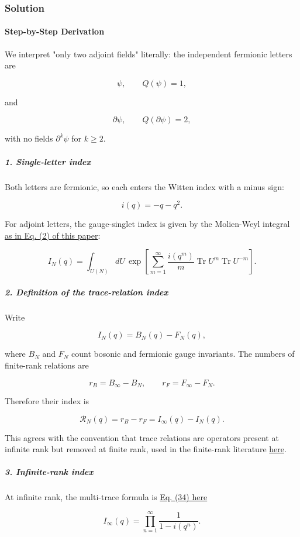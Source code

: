 \subsubsection*{Solution}
\paragraph*{Step-by-Step Derivation}

We interpret "only two adjoint fields" literally: the independent fermionic letters are

\[
\psi,\qquad Q(\psi)=1,
\]

and

\[
\partial\psi,\qquad Q(\partial\psi)=2,
\]

with no fields $\partial^k\psi$ for $k\geq2$.

\subparagraph*{1. Single-letter index}

Both letters are fermionic, so each enters the Witten index with a minus sign:

\[
i(q)=-q-q^2.
\]

For adjoint letters, the gauge-singlet index is given by the Molien-Weyl integral \href{\detokenize{https://arxiv.org/html/2605.08085}}{as in Eq. (2) of this paper}:

\[
I_N(q)=\int_{U(N)}dU\, \exp\left[ \sum_{m=1}^{\infty}\frac{i(q^m)}{m} \operatorname{Tr}U^m\operatorname{Tr}U^{-m} \right].
\]

\subparagraph*{2. Definition of the trace-relation index}

Write

\[
I_N(q)=B_N(q)-F_N(q),
\]

where $B_N$ and $F_N$ count bosonic and fermionic gauge invariants. The numbers of finite-rank relations are

\[
r_B=B_\infty-B_N,\qquad r_F=F_\infty-F_N.
\]

Therefore their index is

\[
\mathcal R_N(q)=r_B-r_F =I_\infty(q)-I_N(q).
\]

This agrees with the convention that trace relations are operators present at infinite rank but removed at finite rank, used in the finite-rank literature \href{\detokenize{https://arxiv.org/html/2605.08085}}{here}.

\subparagraph*{3. Infinite-rank index}

At infinite rank, the multi-trace formula is \href{\detokenize{https://arxiv.org/html/2605.08085}}{Eq. (34) here}

\[
I_\infty(q)=\prod_{n=1}^{\infty}\frac{1}{1-i(q^n)}.
\]


